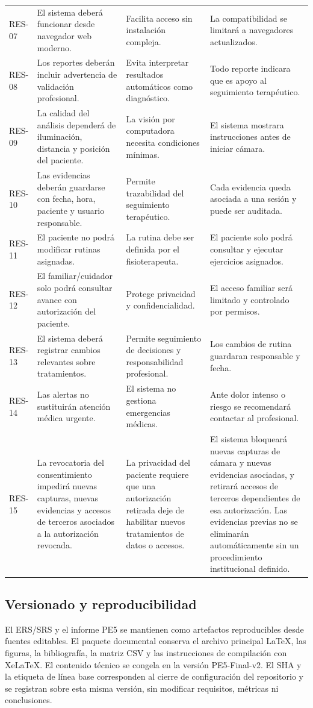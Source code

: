 \documentclass[12pt,a4paper]{article}
\begin{document}
\begin{longtable}{p{}p{}p{}p{}}
RES-07 & El sistema deberá funcionar desde navegador web moderno. & Facilita acceso sin instalación compleja. & La compatibilidad se limitará a navegadores actualizados. \\
RES-08 & Los reportes deberán incluir advertencia de validación profesional. & Evita interpretar resultados automáticos como diagnóstico. & Todo reporte indicara que es apoyo al seguimiento terapéutico. \\
RES-09 & La calidad del análisis dependerá de iluminación, distancia y posición del paciente. & La visión por computadora necesita condiciones mínimas. & El sistema mostrara instrucciones antes de iniciar cámara. \\
RES-10 & Las evidencias deberán guardarse con fecha, hora, paciente y usuario responsable. & Permite trazabilidad del seguimiento terapéutico. & Cada evidencia queda asociada a una sesión y puede ser auditada. \\
RES-11 & El paciente no podrá modificar rutinas asignadas. & La rutina debe ser definida por el fisioterapeuta. & El paciente solo podrá consultar y ejecutar ejercicios asignados. \\
RES-12 & El familiar/cuidador solo podrá consultar avance con autorización del paciente. & Protege privacidad y confidencialidad. & El acceso familiar será limitado y controlado por permisos. \\
RES-13 & El sistema deberá registrar cambios relevantes sobre tratamientos. & Permite seguimiento de decisiones y responsabilidad profesional. & Los cambios de rutina guardaran responsable y fecha. \\
RES-14 & Las alertas no sustituirán atención médica urgente. & El sistema no gestiona emergencias médicas. & Ante dolor intenso o riesgo se recomendará contactar al profesional. \\
RES-15 & La revocatoria del consentimiento impedirá nuevas capturas, nuevas evidencias y accesos de terceros asociados a la autorización revocada. & La privacidad del paciente requiere que una autorización retirada deje de habilitar nuevos tratamientos de datos o accesos. & El sistema bloqueará nuevas capturas de cámara y nuevas evidencias asociadas, y retirará accesos de terceros dependientes de esa autorización. Las evidencias previas no se eliminarán automáticamente sin un procedimiento institucional definido. \\
\bottomrule\end{longtable}\normalsize

\subsection{Versionado y reproducibilidad}
El ERS/SRS y el informe PE5 se mantienen como artefactos reproducibles desde fuentes editables. El paquete documental conserva el archivo principal LaTeX, las figuras, la bibliografía, la matriz CSV y las instrucciones de compilación con XeLaTeX. El contenido técnico se congela en la versión PE5-Final-v2. El SHA y la etiqueta de línea base corresponden al cierre de configuración del repositorio y se registran sobre esta misma versión, sin modificar requisitos, métricas ni conclusiones.
\end{document}
